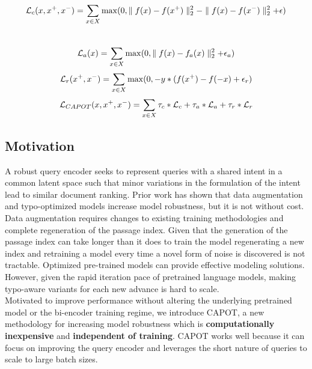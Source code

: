 \begin{tiny}
\begin{equation} 
\label{eq:1} 
    \mathcal{L}_{c}(x, x^+, x^-) = \sum_{x \in X} \max(0,\mathrel{\Vert} f(x) -  f(x^+) \mathrel{\Vert}_2^2 - \mathrel{\Vert} f(x) - f(x^-) \mathrel{\Vert}_2^2 + \epsilon)
\end{equation}\\
\begin{equation} 
\label{eq:2} 
    \mathcal{L}_{a}(x) = \sum_{x \in X} \max(0,\mathrel{\Vert} f(x) - f_a(x) \mathrel{\Vert}_2^2 + \epsilon_{a})
\end{equation}
\begin{equation} 
\label{eq:3} 
    \mathcal{L}_{r}(x^+, x^-) = \sum_{x \in X} \max(0,-y * (f(x^+)-f(-x) + \epsilon_{r})
\end{equation}
\begin{equation} \label{eq:4} 
    \mathcal{L}_{CAPOT}(x, x^+, x^- ) = \sum_{x \in X} \tau_{c} * \mathcal{L}_{c} 
    + \tau_{a} *  \mathcal{L}_{a} + \tau_{r} * \mathcal{L}_{r} 
\end{equation}
\end{tiny}
\subsection{Motivation}
A robust query encoder seeks to represent queries with a shared intent in a common latent space such that minor variations in the formulation of the intent lead to similar document ranking. Prior work has shown that data augmentation and typo-optimized models increase model robustness, but it is not without cost.\\
Data augmentation requires changes to existing training methodologies and complete regeneration of the passage index. Given that the generation of the passage index can take longer than it does to train the model \cite{Karpukhin2020DensePR} regenerating a new index and retraining a model every time a novel form of noise is discovered is not tractable. Optimized pre-trained models can provide effective modeling solutions. However, given the rapid iteration pace of pretrained language models, making typo-aware variants for each new advance is hard to scale.\\
Motivated to improve performance without altering the underlying pretrained model or the bi-encoder training regime, we introduce CAPOT, a new methodology for increasing model robustness which is \textbf{computationally inexpensive} and \textbf{independent of training}. CAPOT works well because it can focus on improving the query encoder and leverages the short nature of queries to scale to large batch sizes. 

